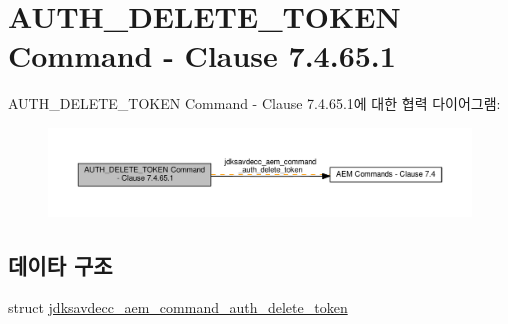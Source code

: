 \hypertarget{group__command__auth__delete__token}{}\section{A\+U\+T\+H\+\_\+\+D\+E\+L\+E\+T\+E\+\_\+\+T\+O\+K\+EN Command -\/ Clause 7.4.65.1}
\label{group__command__auth__delete__token}
A\+U\+T\+H\+\_\+\+D\+E\+L\+E\+T\+E\+\_\+\+T\+O\+K\+EN Command -\/ Clause 7.4.65.1에 대한 협력 다이어그램\+:
\nopagebreak
\begin{figure}[H]
\begin{center}
\leavevmode
\includegraphics[width=350pt]{group__command__auth__delete__token}
\end{center}
\end{figure}
\subsection*{데이타 구조}
\begin{DoxyCompactItemize}
\item 
struct \hyperlink{structjdksavdecc__aem__command__auth__delete__token}{jdksavdecc\+\_\+aem\+\_\+command\+\_\+auth\+\_\+delete\+\_\+token}
\end{DoxyCompactItemize}
